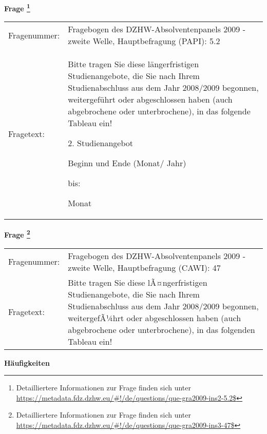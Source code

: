				\vspace*{0.5cm}
                \noindent\textbf{Frage
	                \footnote{Detailliertere Informationen zur Frage finden sich unter
		              \url{https://metadata.fdz.dzhw.eu/\#!/de/questions/que-gra2009-ins2-5.2$}}}\\
				\begin{tabularx}{\hsize}{@{}lX}
					Fragenummer: &
					  Fragebogen des DZHW-Absolventenpanels 2009 - zweite Welle, Hauptbefragung (PAPI):
					  5.2
 \\
					Fragetext: & Bitte tragen Sie diese längerfristigen Studienangebote, die Sie nach Ihrem Studienabschluss aus dem Jahr 2008/2009 begonnen, weitergeführt oder abgeschlossen haben (auch abgebrochene oder unterbrochene), in das folgende Tableau ein!\par  2. Studienangebot\par  Beginn und Ende (Monat/ Jahr)\par  bis:\par  Monat \\
				\end{tabularx}
				\vspace*{0.5cm}
                \noindent\textbf{Frage
	                \footnote{Detailliertere Informationen zur Frage finden sich unter
		              \url{https://metadata.fdz.dzhw.eu/\#!/de/questions/que-gra2009-ins3-47$}}}\\
				\begin{tabularx}{\hsize}{@{}lX}
					Fragenummer: &
					  Fragebogen des DZHW-Absolventenpanels 2009 - zweite Welle, Hauptbefragung (CAWI):
					  47
 \\
					Fragetext: & Bitte tragen Sie diese lÃ¤ngerfristigen Studienangebote, die Sie nach Ihrem Studienabschluss aus dem Jahr 2008/2009 begonnen, weitergefÃ¼hrt oder abgeschlossen haben (auch abgebrochene oder unterbrochene), in das folgenden Tableau ein! \\
				\end{tabularx}





        		\vspace*{0.5cm}
                \noindent\textbf{Häufigkeiten}

